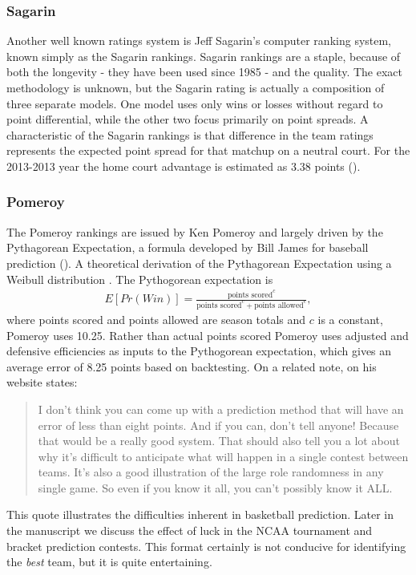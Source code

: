 \subsubsection{Sagarin}
Another well known ratings system is Jeff Sagarin's computer ranking system, known simply as the Sagarin rankings. Sagarin rankings are a staple, because of both the longevity  - they have been used since 1985 - and the quality. The exact methodology is unknown, but the Sagarin rating is actually a composition of three separate models. One model uses only wins or losses without regard to point differential, while the other two focus primarily on point spreads. A characteristic of the Sagarin rankings is that difference in the team ratings represents the expected point spread for that matchup on a neutral court. For the 2013-2013 year the home court advantage is estimated as 3.38 points (\cite{sagarin}).
\subsubsection{Pomeroy}
The Pomeroy rankings are issued by Ken Pomeroy and largely driven by the Pythagorean Expectation, a formula developed by Bill James for baseball prediction (\cite{james}).  A theoretical derivation of the Pythagorean Expectation using a Weibull distribution \cite{miller2007}. The Pythogorean expectation is
\begin{eqnarray}
E[Pr(Win)] = \frac{\text{points scored}^c}{\text{points scored}^c + \text{points allowed}^c},
\end{eqnarray}
where points scored and points allowed are season totals and $c$ is a constant, Pomeroy uses 10.25.  Rather than actual points scored Pomeroy uses adjusted and defensive efficiencies as inputs to the Pythogorean expectation, which gives an average error of 8.25 points based on backtesting.  On a related note, on his website \cite{kenpom.com2} states:
\begin{quote}
I don't think you can come up with a prediction method that will have an error of less than eight points. And if you can, don't tell anyone! Because that would be a really good system. That should also tell you a lot about why it's difficult to anticipate what will happen in a single contest between teams. It's also a good illustration of the large role randomness in any single game. So even if you know it all, you can't possibly know it ALL.
\end{quote}
This quote illustrates the difficulties inherent in basketball prediction. Later in the manuscript we discuss the effect of luck in the NCAA tournament and bracket prediction contests. This format certainly is not conducive for identifying the \emph{best} team, but it is quite entertaining. 
